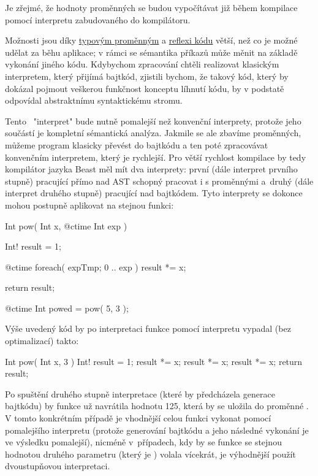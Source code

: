 Je zřejmé, že hodnoty \ctime proměnných se budou vypočítávat již během kompilace pomocí interpretu zabudovaného do kompilátoru.

Možnosti \ctime jsou díky \hyperref[ctime:typeVars]{typovým proměnným} a \hyperref[ctime:reflection]{reflexi kódu} větší, než co je možné udělat za běhu aplikace; v rámci \ctime se sémantika příkazů může měnit na základě vykonání jiného \ctime kódu. Kdybychom zpracování \ctime chtěli realizovat klasickým interpretem, který přijímá bajtkód, zjistili bychom, že takový kód, který by dokázal pojmout veškerou funkčnost konceptu líhnutí kódu, by v podstatě odpovídal abstraktnímu syntaktickému stromu.

Tento \ctime~"interpret" bude nutně pomalejší než konvenční interprety, protože jeho součástí je kompletní sémantická analýza. Jakmile se ale zbavíme \ctime proměnných, můžeme program klasicky převést do bajtkódu a ten poté zpracovávat konvenčním interpretem, který je rychlejší. Pro větší rychlost kompilace by tedy kompilátor jazyka Beast měl mít dva interprety: první (dále interpret prvního stupně) pracující přímo nad AST schopný pracovat i s \ctime proměnnými a~druhý (dále interpret druhého stupně) pracující nad bajtkódem. Tyto interprety se dokonce mohou postupně aplikovat na stejnou funkci:

\begin{code}
Int pow( Int x, @ctime Int exp ) {
	Int! result = 1;
	
	@ctime foreach( expTmp; 0 .. exp )
		result *= x;
		
	return result;
}

@ctime Int powed = pow( 5, 3 );
\end{code}

Výše uvedený kód by po interpretaci funkce  pomocí \ctime interpretu vypadal (bez optimalizací) takto:

\begin{code}
Int pow( Int x, 3 ) {
	Int! result = 1;
	result *= x;
	result *= x;
	result *= x;
	return result;
}
\end{code}

Po spuštění druhého stupně interpretace (které by předcházela generace bajtkódu) by funkce už navrátila hodnotu 125, která by se uložila do proměnné . V tomto konkrétním případě je vhodnější celou funkci vykonat pomocí pomalejšího \ctime interpretu (protože generování bajtkódu a jeho následné vykonání je ve výsledku pomalejší), nicméně v~případech, kdy by se funkce  se stejnou hodnotou druhého parametru (který je \ctime) volala vícekrát, je výhodnější použít dvoustupňovou interpretaci.

